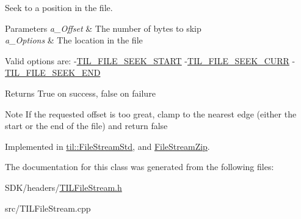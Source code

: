 Seek to a position in the file. 


\begin{DoxyParams}{Parameters}
{\em a\_\-Offset} & The number of bytes to skip \\
\hline
{\em a\_\-Options} & The location in the file\\
\hline
\end{DoxyParams}
Valid options are: -\/\hyperlink{_t_i_l_settings_8h_a973d977edd49701c43cece50966e26a2}{TIL\_\-FILE\_\-SEEK\_\-START} -\/\hyperlink{_t_i_l_settings_8h_a5055479b805b9dfdd4383561c8ce0006}{TIL\_\-FILE\_\-SEEK\_\-CURR} -\/\hyperlink{_t_i_l_settings_8h_a56022a317f988fecf7ed712b02382378}{TIL\_\-FILE\_\-SEEK\_\-END}

\begin{DoxyReturn}{Returns}
True on success, false on failure
\end{DoxyReturn}
\begin{DoxyNote}{Note}
If the requested offset is too great, clamp to the nearest edge (either the start or the end of the file) and return false 
\end{DoxyNote}


Implemented in \hyperlink{classtil_1_1_file_stream_std_a8e3874550cefaec46846237a68c7727d}{til::FileStreamStd}, and \hyperlink{class_file_stream_zip_abbf7165ff3ce594b1013307f7cbdcb43}{FileStreamZip}.



The documentation for this class was generated from the following files:\begin{DoxyCompactItemize}
\item 
SDK/headers/\hyperlink{_t_i_l_file_stream_8h}{TILFileStream.h}\item 
src/TILFileStream.cpp\end{DoxyCompactItemize}
